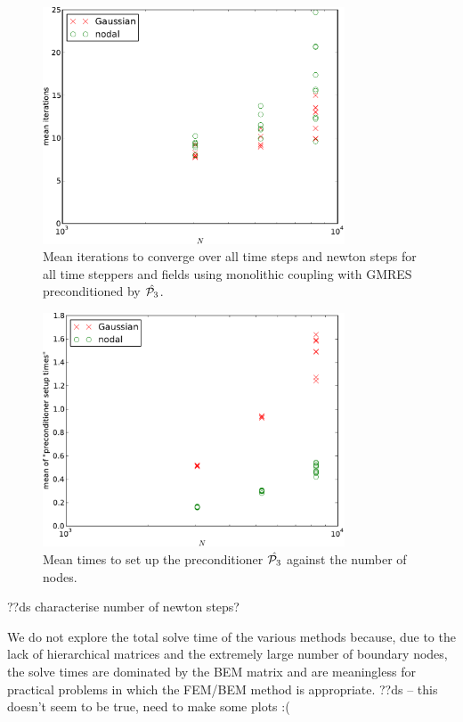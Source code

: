 \begin{figure}
  \centering
  \includegraphics[width=0.8\textwidth]
  {plots/mumag4_monolithic_its/meanofnsolveritersvsinitialnnode.pdf}
  \caption{Mean iterations to converge over all time steps and newton steps for all time steppers and fields using monolithic coupling with GMRES preconditioned by $\hat{\mathcal{P}_3}$.}
  \label{fig:mumag4-solver-iterations}
\end{figure}

\begin{figure}
  \centering
  \includegraphics[width=0.8\textwidth]{plots/mumag4_monolithic_its/meanofpreconditionersetuptimesvsinitialnnode.pdf}
  \caption{Mean times to set up the preconditioner $\hat{\mathcal{P}_3}$ against the number of nodes.}
  \label{fig:mumag4-solver-time}
\end{figure}


??ds characterise number of newton steps?


We do not explore the total solve time of the various methods because, due to the lack of hierarchical matrices and the extremely large number of boundary nodes, the solve times are dominated by the BEM matrix and are meaningless for practical problems in which the FEM/BEM method is appropriate.
??ds -- this doesn't seem to be true, need to make some plots :(


